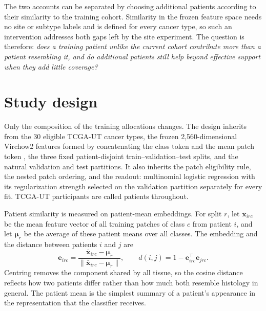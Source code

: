 \documentclass[11pt]{article}
\begin{document}
The two accounts can be separated by choosing additional patients according to their similarity to the training cohort. Similarity in the frozen feature space needs no site or subtype labels and is defined for every cancer type, so such an intervention addresses both gaps left by the site experiment. The question is therefore: \emph{does a training patient unlike the current cohort contribute more than a patient resembling it, and do additional patients still help beyond effective support when they add little coverage?}

\section{Study design}
\label{sec:design}
Only the composition of the training allocations changes. The design inherits from \citet{queisler2026effectiveSupport} the 30 eligible TCGA-UT cancer types, the frozen 2,560-dimensional Virchow2 features formed by concatenating the class token and the mean patch token \citep{zimmermann2024virchow2}, the three fixed patient-disjoint train--validation--test splits, and the natural validation and test partitions. It also inherits the patch eligibility rule, the nested patch ordering, and the readout: multinomial logistic regression with its regularization strength selected on the validation partition separately for every fit. TCGA-UT participants are called patients throughout.

Patient similarity is measured on patient-mean embeddings. For split $r$, let $\bar{\mathbf x}_{irc}$ be the mean feature vector of all training patches of class $c$ from patient $i$, and let $\boldsymbol\mu_r$ be the average of these patient means over all classes. The embedding and the distance between patients $i$ and $j$ are
\begin{equation}
 \mathbf e_{irc}=\frac{\bar{\mathbf x}_{irc}-\boldsymbol\mu_r}{\lVert\bar{\mathbf x}_{irc}-\boldsymbol\mu_r\rVert},
 \qquad
 d(i,j)=1-\mathbf e_{irc}^{\top}\mathbf e_{jrc}.
 \label{eq:distance}
\end{equation}
\noindent Centring removes the component shared by all tissue, so the cosine distance reflects how two patients differ rather than how much both resemble histology in general. The patient mean is the simplest summary of a patient's appearance in the representation that the classifier receives.
\end{document}
